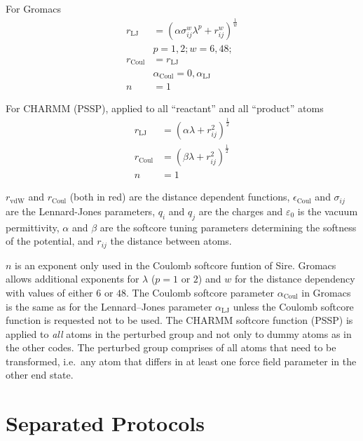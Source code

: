 \documentclass[journal=jctcce,manuscript=suppinfo]{achemso}
\begin{document}
For Gromacs
\begin{equation}
  \begin{split}
    r_{\mathrm{LJ}} &= (\alpha \sigma_{ij}^{w} \lambda^{p} +
    r_{ij}^{w})^{\frac{1}{w}} \\
    &p = 1,2; w = 6,48; \\
    r_{\mathrm{Coul}} &= r_{\mathrm{LJ}} \\
    &\alpha_{\mathrm{Coul}} = 0,\alpha_{\mathrm{LJ}} \\
    n &= 1
  \end{split}
  \label{eq:Gromacs}
\end{equation}

For CHARMM (PSSP), applied to all ``reactant'' and all ``product'' atoms
\begin{equation}
  \begin{split}
    r_{\mathrm{LJ}} &= (\alpha \lambda + r_{ij}^2)^{\frac{1}{2}} \\
    r_{\mathrm{Coul}} &= (\beta\lambda + r_{ij}^{2})^{\frac{1}{2}} \\
    n &= 1
   \end{split}
  \label{eq:CHARMM}
\end{equation}

$r_{\mathrm{vdW}}$ and $r_{\mathrm{Coul}}$ (both in red) are the
distance dependent functions, $\epsilon_{\mathrm{Coul}}$ and
$\sigma_{ij}$ are the Lennard-Jones parameters, $q_{i}$ and $q_{j}$
are the charges and $\varepsilon_{0}$ is the vacuum permittivity,
$\alpha$ and $\beta$ are the softcore tuning parameters determining
the softness of the potential, and $r_{ij}$ the distance between
atoms.

$n$ is an exponent only used in the Coulomb softcore funtion of Sire.
Gromacs allows additional exponents for $\lambda$ ($p = 1$ or $2$) and
$w$ for the distance dependency with values of either $6$ or $48$.
The Coulomb softcore parameter $\alpha_{\mathrm{Coul}}$ in Gromacs is
the same as for the Lennard--Jones parameter $\alpha_{\mathrm{LJ}}$
unless the Coulomb softcore function is requested not to be used.  The
CHARMM softcore function (PSSP) is applied to \emph{all} atoms in the
perturbed group and not only to dummy atoms as in the other codes.
The perturbed group comprises of all atoms that need to be
transformed, i.e.\ any atom that differs in at least one force field
parameter in the other end state.

\section{Separated Protocols}
\end{document}
